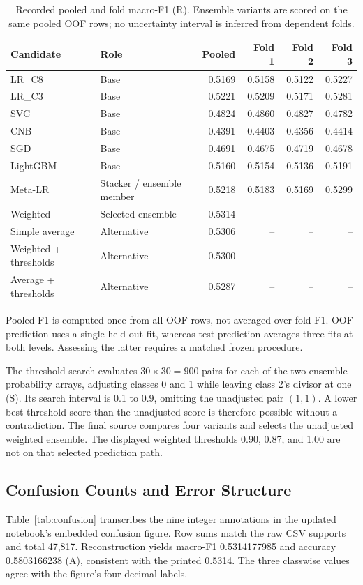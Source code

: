 \documentclass[doublecolumn]{ijcvsplatex}
\begin{document}
\begin{table}[t]
\small\centering
\caption{Recorded pooled and fold macro-F1 (R). Ensemble variants are scored on the same pooled OOF rows; no uncertainty interval is inferred from dependent folds.}
\label{tab:results}
\begin{tabular}{llrrrr}
\toprule
Candidate & Role & Pooled & Fold 1 & Fold 2 & Fold 3 \\
\midrule
LR\_C8 & Base & 0.5169 & 0.5158 & 0.5122 & 0.5227 \\
LR\_C3 & Base & 0.5221 & 0.5209 & 0.5171 & 0.5281 \\
SVC & Base & 0.4824 & 0.4860 & 0.4827 & 0.4782 \\
CNB & Base & 0.4391 & 0.4403 & 0.4356 & 0.4414 \\
SGD & Base & 0.4691 & 0.4675 & 0.4719 & 0.4678 \\
LightGBM & Base & 0.5160 & 0.5154 & 0.5136 & 0.5191 \\
Meta-LR & Stacker / ensemble member & 0.5218 & 0.5183 & 0.5169 & 0.5299 \\
\midrule
Weighted & Selected ensemble & 0.5314 & -- & -- & -- \\
Simple average & Alternative & 0.5306 & -- & -- & -- \\
Weighted + thresholds & Alternative & 0.5300 & -- & -- & -- \\
Average + thresholds & Alternative & 0.5287 & -- & -- & -- \\
\bottomrule
\end{tabular}
\end{table}

Pooled F1 is computed once from all OOF rows, not averaged over fold F1. OOF prediction uses a single held-out fit, whereas test prediction averages three fits at both levels. Assessing the latter requires a matched frozen procedure.

The threshold search evaluates $30\times30=900$ pairs for each of the two ensemble probability arrays, adjusting classes 0 and 1 while leaving class 2's divisor at one (S). Its search interval is 0.1 to 0.9, omitting the unadjusted pair $(1,1)$. A lower best threshold score than the unadjusted score is therefore possible without a contradiction. The final source compares four variants and selects the unadjusted weighted ensemble. The displayed weighted thresholds 0.90, 0.87, and 1.00 are not on that selected prediction path.

\subsection{Confusion Counts and Error Structure}
Table~\ref{tab:confusion} transcribes the nine integer annotations in the updated notebook's embedded confusion figure. Row sums match the raw CSV supports and total 47,817. Reconstruction yields macro-F1 0.5314177985 and accuracy 0.5803166238 (A), consistent with the printed 0.5314. The three classwise values agree with the figure's four-decimal labels.
\end{document}

